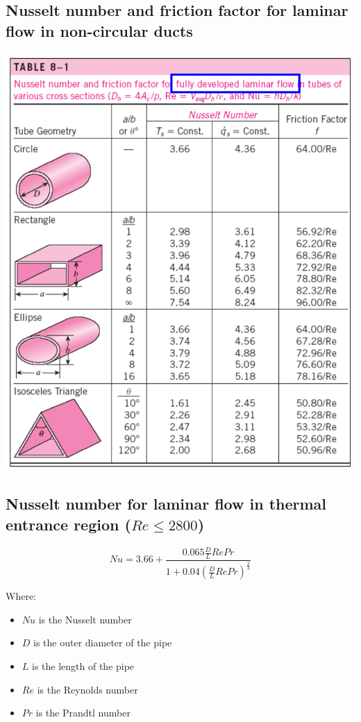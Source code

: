 \documentclass[11pt]{article}
\begin{document}
\subsection{Nusselt number and friction factor for laminar flow in non-circular ducts}
\label{sec:org040c154}
\begin{center}
\includegraphics[width=.9\linewidth]{./images/laminar-flow-in-non-circular-ducts-table.png}
\end{center}

 \newpage
\subsection{Nusselt number for laminar flow in thermal entrance region (\(Re \le 2800\))}
\label{sec:org2057a64}
\[Nu = 3.66 + \frac{0.065 \frac{D}{L} Re Pr}{1 + 0.04 \left(\frac{D}{L} Re Pr \right)^{\frac{2}{3}}}\]

Where:
\begin{itemize}
\item \(Nu\) is the Nusselt number
\item \(D\) is the outer diameter of the pipe
\item \(L\) is the length of the pipe
\item \(Re\) is the Reynolds number
\item \(Pr\) is the Prandtl number
\end{itemize}
\end{document}
